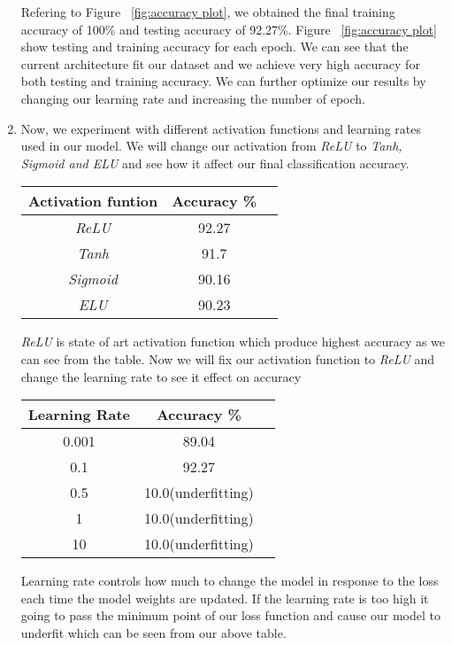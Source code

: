 \documentclass[11pt]{article}
\begin{document}
\begin{enumerate}[label=(\alph*)]
	Refering to Figure ~\ref{fig:accuracy plot}, we obtained the final training accuracy of 100\% and testing accuracy of 92.27\%.  Figure ~\ref{fig:accuracy plot} show testing and training accuracy for each epoch.
	We can see that the current architecture fit our dataset and we achieve very high accuracy for both testing and training accuracy. We can further optimize our results by changing our learning rate and increasing the number of epoch. 
	\item Now, we experiment with different activation functions and learning rates used in our model. We will change our activation from \textit{ReLU} to \textit{Tanh, Sigmoid and ELU} and see how it affect our final classification accuracy.\newline 
	\begin{center}
		\begin{tabular}{|c |c c|} 
			\hline
			Activation funtion & Accuracy \%& \\ 
			\hline
			\textit{ReLU} & 92.27  &\\ 
			\hline
			\textit{Tanh}  & 91.7  &\\
			\hline
			\textit{Sigmoid} & 90.16 &\\
			\hline
			\textit{ELU} & 90.23  &\\  
			\hline
		\end{tabular}
	\end{center}
\textit{ReLU} is state of art activation function which produce highest accuracy as we can see from the table.
Now we will fix our activation function to \textit{ReLU} and change the learning rate to see it effect on accuracy
	\begin{center}
	\begin{tabular}{|c |c c|} 
		\hline
	Learning Rate & Accuracy \%& \\ 
		\hline
		0.001 & 89.04  &\\
		\hline
		0.1 & 92.27 &\\
		\hline
		0.5 & 10.0(underfitting)  &\\  
		\hline
		1 & 10.0(underfitting)  &\\  
		\hline
		10 & 10.0(underfitting)  &\\  
		\hline
	\end{tabular}
\end{center}
Learning rate controls how much to change the model in response to the loss each time the model weights are updated. If the learning rate is too high it going to pass the minimum point of our loss function and cause our model to underfit which can be seen from our above table. 


\end{enumerate}
\end{document}
